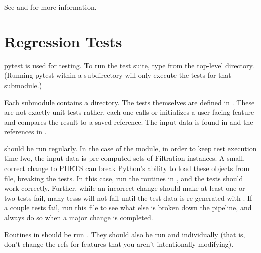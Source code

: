 \documentclass[letterpaper,10pt,openany,oneside,english]{sphinxmanual}
\begin{document}
See 
and 
for more information.


\chapter{Regression Tests}
\label{\detokenize{index:regression-tests}}
pytest is used for testing. To run the test suite, type 
from the top-level directory. (Running pytest within a subdirectory will only
execute the tests for that submodule.)

Each submodule contains a  directory. The tests themselves are
defined in . These are not exactly
unit tests \textendash{} rather, each one calls or initializes a user-facing feature and
compares the result to a saved reference. The input data is found in
 and the references in .

 should be run regularly.
In the case of the  module, in order to keep test execution time
lwo, the input data is pre-computed sets of Filtration instances. A small,
correct change to PHETS can break Python’s ability to load these objects from
file, breaking the tests. In this case, run the routines in
, and the tests should work correctly.
Further, while an incorrect change should make at least one or two tests fail,
many  tesss will not fail until the test data is re-generated with
. If a couple tests fail, run this file to see what else is
broken down the pipeline, and always do so when a major change is completed.

Routines in  should be run . They should also be run and
individually (that is, don’t change the refs for features that you aren’t
intentionally modifying).
\end{document}
